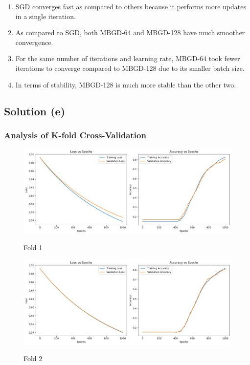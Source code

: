 \documentclass{article}
\begin{document}
\begin{enumerate}
\item SGD converges fast as compared to others because it performs more updates in a single iteration.
\item As compared to SGD, both MBGD-64 and MBGD-128 have much smoother convergence.
\item For the same number of iterations and learning rate, MBGD-64 took fewer iterations to converge compared to MBGD-128 due to its smaller batch size.
\item In terms of stability, MBGD-128 is much more stable than the other two.
\end{enumerate}

\vspace{10pt}
\subsection*{Solution (e)}
\subsubsection*{Analysis of K-fold Cross-Validation}

\begin{figure}[H] %
    \centering
    \begin{minipage}{0.49\linewidth}
        \centering
        \includegraphics[width=\linewidth]{assets/e-f1.png}
        \caption{Fold 1}{}
        \label{fig:b-1}
    \end{minipage}
    \hfill
    \begin{minipage}{0.49\linewidth}
        \centering
        \includegraphics[width=\linewidth]{assets/e-f2.png}
        \caption{Fold 2}{}
        \label{fig:b-2}
    \end{minipage}
\end{figure}
\end{document}
